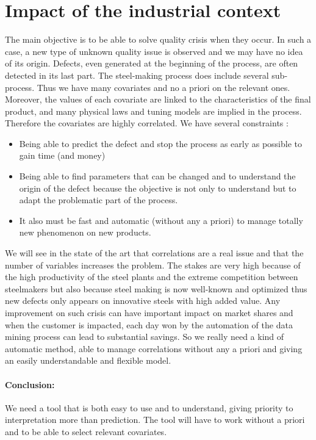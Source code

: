 \documentclass[12pt,a4paper]{report}
\begin{document}
	\section{Impact of the industrial context}
	 The main objective is to be able to solve quality crisis when they occur. In such a case, a new type of unknown quality issue is observed and we may have no idea of its origin. Defects, even generated at the beginning of the process, are often detected in its last part. The steel-making process does include several sub-process. Thus we have many covariates and no a priori on the relevant ones. Moreover, the values of each covariate are linked to the characteristics of the final product, and many physical laws and tuning models are implied in the process. Therefore the covariates are highly correlated.
	We have several constraints :
	\begin{itemize}
		\item Being able to predict the defect and stop the process as early as possible to gain time (and money)
		\item Being able to find parameters that can be changed and to understand the origin of the defect because the objective is not only to understand but to adapt the problematic part of the process.
		\item It also must be fast and automatic (without any a priori) to manage totally new phenomenon on new products.
	\end{itemize}
	We will see in the state of the art that correlations are a real issue and that the number of variables increases the problem.	
	The stakes are very high because of the high productivity of the steel plants and the extreme competition between steelmakers but also because steel making is now well-known and optimized thus new defects only appears on innovative steels with high added value. Any improvement on such crisis can have important impact on market shares and when the customer is impacted, each day won by the automation of the data mining process can lead to substantial savings. So we really need a kind of automatic method, able to manage correlations without any a priori and giving an easily understandable and flexible model.

\paragraph{Conclusion:} We need a tool that is both easy to use and to understand, giving priority to interpretation more than prediction. The tool will have to work without a priori and to be able to select relevant covariates.
	
\end{document}
